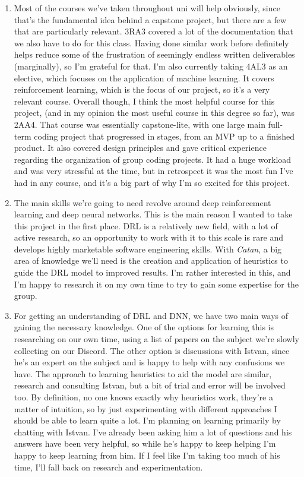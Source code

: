 \documentclass{article}
\begin{document}
\begin{enumerate}
    \item Most of the courses we've taken throughout uni will help obviously, since that's the fundamental idea behind a capstone project, but there are a few that are particularly relevant.
    3RA3 covered a lot of the documentation that we also have to do for this class.
    Having done similar work before definitely helps reduce some of the frustration of seemingly endless written deliverables (marginally), so I'm grateful for that.
    I'm also currently taking 4AL3 as an elective, which focuses on the application of machine learning.
    It covers reinforcement learning, which is the focus of our project, so it's a very relevant course.
    Overall though, I think the most helpful course for this project, (and in my opinion the most useful course in this degree so far), was 2AA4.
    That course was essentially capstone-lite, with one large main full-term coding project that progressed in stages, from an MVP up to a finished product.
    It also covered design principles and gave critical experience regarding the organization of group coding projects.
    It had a huge workload and was very stressful at the time, but in retrospect it was the most fun I've had in any course, and it's a big part of why I'm so excited for this project.

    \item The main skills we're going to need revolve around deep reinforcement learning and deep neural networks.
    This is the main reason I wanted to take this project in the first place.
    DRL is a relatively new field, with a lot of active research, so an opportunity to work with it to this scale is rare and develops highly marketable software engineering skills.
    With \emph{Catan}, a big area of knowledge we'll need is the creation and application of heuristics to guide the DRL model to improved results.
    I'm rather interested in this, and I'm happy to research it on my own time to try to gain some expertise for the group.

    \item For getting an understanding of DRL and DNN, we have two main ways of gaining the necessary knowledge.
    One of the options for learning this is researching on our own time, using a list of papers on the subject we're slowly collecting on our Discord.
    The other option is discussions with Istvan, since he's an expert on the subject and is happy to help with any confusions we have.
    The approach to learning heuristics to aid the model are similar, research and consulting Istvan, but a bit of trial and error will be involved too.
    By definition, no one knows exactly why heuristics work, they're a matter of intuition, so by just experimenting with different approaches I should be able to learn quite a lot.
    I'm planning on learning primarily by chatting with Istvan.
    I've already been asking him a lot of questions and his answers have been very helpful, so while he's happy to keep helping I'm happy to keep learning from him.
    If I feel like I'm taking too much of his time, I'll fall back on research and experimentation.

\end{enumerate}
\end{document}
